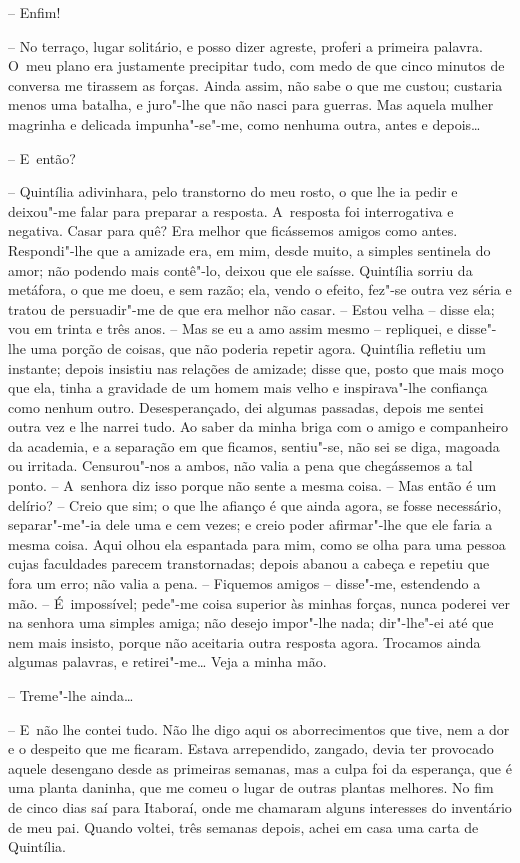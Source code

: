 -- Enfim!

-- No terraço, lugar solitário, e posso dizer agreste, proferi a
primeira palavra. O~meu plano era justamente precipitar tudo, com medo
de que cinco minutos de conversa me tirassem as forças. Ainda assim, não
sabe o que me custou; custaria menos uma batalha, e juro"-lhe que não
nasci para guerras. Mas aquela mulher magrinha e delicada impunha"-se"-me,
como nenhuma outra, antes e depois\ldots{}

-- E~então?

-- Quintília adivinhara, pelo transtorno do meu rosto, o que lhe ia
pedir e deixou"-me falar para preparar a resposta. A~resposta foi
interrogativa e negativa. Casar para quê? Era melhor que ficássemos
amigos como antes. Respondi"-lhe que a amizade era, em mim, desde muito,
a simples sentinela do amor; não podendo mais contê"-lo, deixou que ele
saísse. Quintília sorriu da metáfora, o que me doeu, e sem razão; ela,
vendo o efeito, fez"-se outra vez séria e tratou de persuadir"-me de que
era melhor não casar. -- Estou velha -- disse ela; vou em trinta e três
anos. -- Mas se eu a amo assim mesmo -- repliquei, e disse"-lhe uma
porção de coisas, que não poderia repetir agora. Quintília refletiu um
instante; depois insistiu nas relações de amizade; disse que, posto que
mais moço que ela, tinha a gravidade de um homem mais velho e
inspirava"-lhe confiança como nenhum outro. Desesperançado, dei algumas
passadas, depois me sentei outra vez e lhe narrei tudo. Ao saber da
minha briga com o amigo e companheiro da academia, e a separação em que
ficamos, sentiu"-se, não sei se diga, magoada ou irritada. Censurou"-nos a
ambos, não valia a pena que chegássemos a tal ponto. -- A~senhora diz
isso porque não sente a mesma coisa. -- Mas então é um delírio? -- Creio
que sim; o que lhe afianço é que ainda agora, se fosse necessário,
separar"-me"-ia dele uma e cem vezes; e creio poder afirmar"-lhe que ele
faria a mesma coisa. Aqui olhou ela espantada para mim, como se olha
para uma pessoa cujas faculdades parecem transtornadas; depois abanou a
cabeça e repetiu que fora um erro; não valia a pena. -- Fiquemos amigos
-- disse"-me, estendendo a mão. -- É~impossível; pede"-me coisa superior
às minhas forças, nunca poderei ver na senhora uma simples amiga; não
desejo impor"-lhe nada; dir"-lhe"-ei até que nem mais insisto, porque não
aceitaria outra resposta agora. Trocamos ainda algumas palavras, e
retirei"-me\ldots{} Veja a minha mão.

-- Treme"-lhe ainda\ldots{}

-- E~não lhe contei tudo. Não lhe digo aqui os aborrecimentos que tive,
nem a dor e o despeito que me ficaram. Estava arrependido, zangado,
devia ter provocado aquele desengano desde as primeiras semanas, mas a
culpa foi da esperança, que é uma planta daninha, que me comeu o lugar
de outras plantas melhores. No fim de cinco dias saí para Itaboraí, onde
me chamaram alguns interesses do inventário de meu pai. Quando voltei,
três semanas depois, achei em casa uma carta de Quintília.

